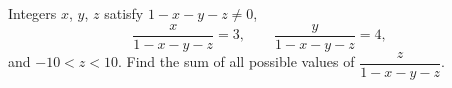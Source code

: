 Integers $x$, $y$, $z$ satisfy $1-x-y-z\ne0$,
\[\dfrac{x}{1-x-y-z}=3,\qquad\dfrac{y}{1-x-y-z}=4,\]
and $-10<z<10$. Find the sum of all possible values of $\dfrac{z}{1-x-y-z}$.
